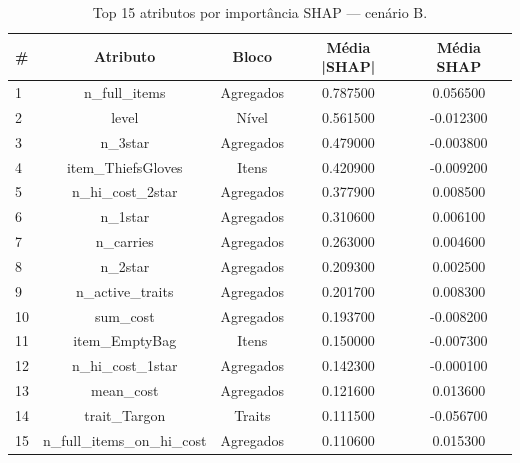 \begin{table}[htbp]
\caption{Top 15 atributos por importância SHAP — cenário B.}
\label{tab:topB}
\centering
\small
\begin{tabular}{lcccc}
\toprule
\# & Atributo & Bloco & Média |SHAP| & Média SHAP \\
\midrule
1 & n\_full\_items & Agregados & 0.787500 & 0.056500 \\
2 & level & Nível & 0.561500 & -0.012300 \\
3 & n\_3star & Agregados & 0.479000 & -0.003800 \\
4 & item\_ThiefsGloves & Itens & 0.420900 & -0.009200 \\
5 & n\_hi\_cost\_2star & Agregados & 0.377900 & 0.008500 \\
6 & n\_1star & Agregados & 0.310600 & 0.006100 \\
7 & n\_carries & Agregados & 0.263000 & 0.004600 \\
8 & n\_2star & Agregados & 0.209300 & 0.002500 \\
9 & n\_active\_traits & Agregados & 0.201700 & 0.008300 \\
10 & sum\_cost & Agregados & 0.193700 & -0.008200 \\
11 & item\_EmptyBag & Itens & 0.150000 & -0.007300 \\
12 & n\_hi\_cost\_1star & Agregados & 0.142300 & -0.000100 \\
13 & mean\_cost & Agregados & 0.121600 & 0.013600 \\
14 & trait\_Targon & Traits & 0.111500 & -0.056700 \\
15 & n\_full\_items\_on\_hi\_cost & Agregados & 0.110600 & 0.015300 \\
\bottomrule
\end{tabular}
\end{table}
